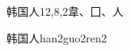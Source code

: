 \begin{entry}{韩国人}{12,8,2}{⾱、⼞、⼈}
  \begin{phonetics}{韩国人}{han2guo2ren2}
  \end{phonetics}
\end{entry}
